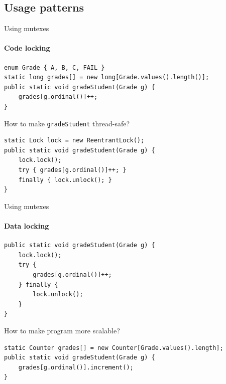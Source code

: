 \subsection{Usage patterns}
\showTOCSub

\begin{frame}[fragile]{Using mutexes}
\framesubtitle{Code locking}

\begin{verbatim}
enum Grade { A, B, C, FAIL }
static long grades[] = new long[Grade.values().length()];
public static void gradeStudent(Grade g) {
    grades[g.ordinal()]++;
}
\end{verbatim}

How to make \texttt{gradeStudent} thread-safe?

\pause
\begin{verbatim}
static Lock lock = new ReentrantLock();
public static void gradeStudent(Grade g) {
    lock.lock(); 
    try { grades[g.ordinal()]++; } 
    finally { lock.unlock(); }
}
\end{verbatim}
\end{frame}

\begin{frame}[fragile]{Using mutexes}
\framesubtitle{Data locking}

\begin{verbatim}
public static void gradeStudent(Grade g) {
    lock.lock(); 
    try { 
        grades[g.ordinal()]++; 
    } finally { 
        lock.unlock(); 
    }
}
\end{verbatim}

How to make program more scalable?

\pause

\begin{verbatim}
static Counter grades[] = new Counter[Grade.values().length];
public static void gradeStudent(Grade g) {
    grades[g.ordinal()].increment();
}
\end{verbatim}

\end{frame}



